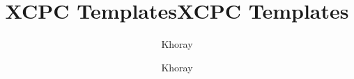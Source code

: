 \documentclass[10pt,a4paper]{article}
\title{XCPC Templates}
\author{Khoray}
\begin{document}
\title{XCPC Templates}
\author {Khoray}
\maketitle
\newpage
\tableofcontents
\newpage


\newpage

\end{document}
